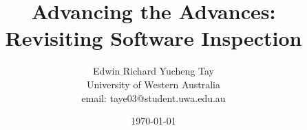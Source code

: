 \documentclass{cshonours}
\title{Advancing the Advances: Revisiting Software Inspection}
\author{Edwin Richard Yucheng Tay \\
University of Western Australia \\
email: taye03@student.uwa.edu.au }
\date{\today}
\begin{document}
\maketitle



\pagebreak

\tableofcontents









\appendix




\end{document}
